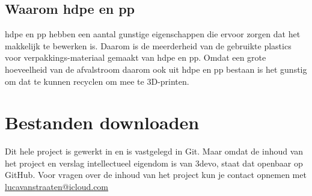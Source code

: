 \subsection{Waarom \ac{hdpe} en \ac{pp}}

\ac{hdpe} en \ac{pp} hebben een aantal gunstige eigenschappen die ervoor
zorgen dat het makkelijk te bewerken is.  Daarom is de meerderheid van de
gebruikte plastics voor verpakkings-materiaal gemaakt van \ac{hdpe} en \ac{pp}.
Omdat een grote hoeveelheid van de afvalstroom daarom ook uit \ac{hdpe} en
\ac{pp} bestaan is het gunstig om dat te kunnen recyclen om mee te 3D-printen.

\section{Bestanden downloaden}

Dit hele project is gewerkt in en is vastgelegd in Git. Maar omdat de inhoud
van het project en verslag intellectueel eigendom is van 3devo, staat dat
openbaar op GitHub. Voor vragen over de inhoud van het project kun je contact
opnemen met
\href{mailto:lucavanstraaten@icloud.com}{lucavanstraaten@icloud.com}
